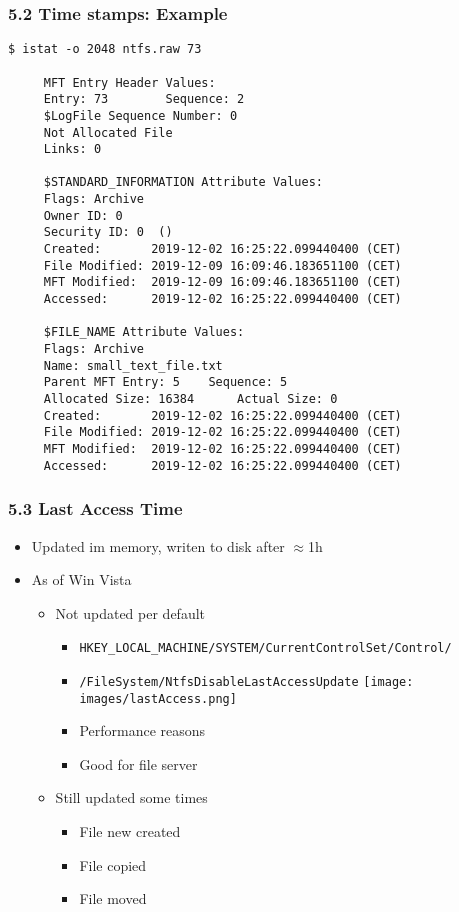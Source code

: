 \begin{frame}[fragile]
\frametitle{5.2 Time stamps: Example}
  \begin{lstlisting}[basicstyle=\tiny]
$ istat -o 2048 ntfs.raw 73

     MFT Entry Header Values:
     Entry: 73        Sequence: 2
     $LogFile Sequence Number: 0
     Not Allocated File
     Links: 0

     $STANDARD_INFORMATION Attribute Values:
     Flags: Archive
     Owner ID: 0
     Security ID: 0  ()
     Created:   	2019-12-02 16:25:22.099440400 (CET)
     File Modified:	2019-12-09 16:09:46.183651100 (CET)
     MFT Modified:	2019-12-09 16:09:46.183651100 (CET)
     Accessed:  	2019-12-02 16:25:22.099440400 (CET)

     $FILE_NAME Attribute Values:
     Flags: Archive
     Name: small_text_file.txt
     Parent MFT Entry: 5 	Sequence: 5
     Allocated Size: 16384   	Actual Size: 0
     Created:   	2019-12-02 16:25:22.099440400 (CET)
     File Modified:	2019-12-02 16:25:22.099440400 (CET)
     MFT Modified:	2019-12-02 16:25:22.099440400 (CET)
     Accessed:  	2019-12-02 16:25:22.099440400 (CET)
  \end{lstlisting}
\end{frame}


\begin{frame}[fragile]
\frametitle{5.3 Last Access Time}
    \begin{itemize}
        \item Updated im memory, writen to disk after $\approx$1h
        \item As of Win Vista
        \begin{itemize}
            \item Not updated per default
            \begin{itemize}
		\item \texttt{\footnotesize HKEY\_LOCAL\_MACHINE/SYSTEM/CurrentControlSet/Control/}
		\item[] \texttt{\footnotesize /FileSystem/NtfsDisableLastAccessUpdate}
			\texttt{[image: images/lastAccess.png]}
                \item Performance reasons
                \item Good for file server
            \end{itemize}
            \item Still updated some times
            \begin{itemize}
                \item File new created
                \item File copied
                \item File moved
            \end{itemize}
        \end{itemize}
    \end{itemize}
\end{frame}


